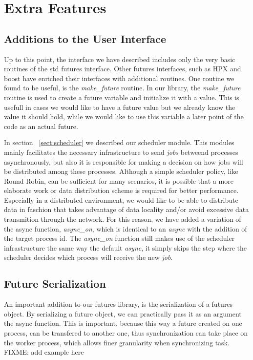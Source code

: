 \chapter{Extra Features}

\section{Additions to the User Interface}
Up to this point, the interface we have described includes only the very basic routines of the std futures interface.
Other futures interfaces, such as HPX and boost have enriched their interfaces with additional routines.  One routine
we found to be useful, is the \emph{make\_future} routine.  In our library, the \emph{make\_future} routine is used
to create a future variable and initialize it with a value.  This is usefull in cases we would like to have a future
value but we already know the value it should hold, while we would like to use this variable a later point of the code
as an actual future.

In section ~\ref{sect:scheduler} we described our scheduler module.  This modules mainly facilitates the necessary 
infrastructure to send \emph{jobs} betweend processes asynchronously, but also it is responsible for making a decision
on how jobs will be distributed among these processes.  Although a simple scheduler policy, like Round Robin, 
can be sufficient for many scenarios, it is possible that a more elaborate work or data distribution scheme is required
for better performance.  Especially in a distributed environment, we would like to be able to distribute data in faschion
that takes advantage of data locality and/or avoid excessive data transmition through the network.  For this reason, we
have added a variation of the async function, \emph{async\_on}, which is identical to an \emph{async} with the addition of
the target process id.  The \emph{async\_on} function still makes use of the scheduler infrastructure the same way
the default \emph{async}, it simply skips the step where the scheduler decides which process will receive the new 
\emph{job}.

\section{Future Serialization}
An important addition to our futures library, is the serialization of a futures object.  By serializing a future
object, we can practically pass it as an argument the async function.  This is important, because this way
a future created on one process, can be transfered to another one, thus synchronization can take place on the 
worker process, which allows finer granularity when synchronizing task.  FIXME: add example here


